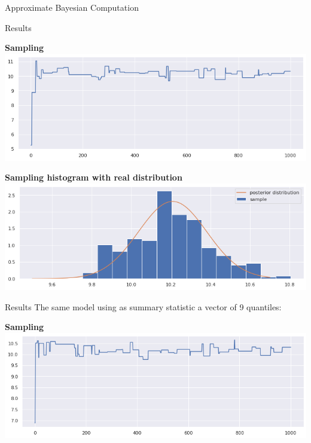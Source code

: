 \documentclass{beamer}
\begin{document}
\begin{section}{Approximate Bayesian Computation}
\begin{frame}{Results}
\begin{minipage}{0.45\textwidth}
\begin{center}
	{\scriptsize \textbf{Sampling}}
	\includegraphics[width=\textwidth]{ABC_graphs/ABCiter1000}
\end{center}
\end{minipage}
\hfill
\begin{minipage}{0.45\textwidth}
\begin{center}
	{\scriptsize \textbf{Sampling histogram with real distribution}}
	\includegraphics[width=\textwidth]{ABC_graphs/ABCunivgraphic}
\end{center}
\end{minipage}


\end{frame}


\begin{frame}{Results}
The same model using as summary statistic a vector of 9 quantiles:
\begin{center}
	\begin{minipage}{0.63\textwidth}
		\begin{center}
			{\scriptsize \textbf{Sampling}}
			\includegraphics[width=\textwidth]{ABC_graphs/ABC_S1_1000iter}
		\end{center}
	\end{minipage}
	

\end{center}
\end{frame}
\end{section}
\end{document}
